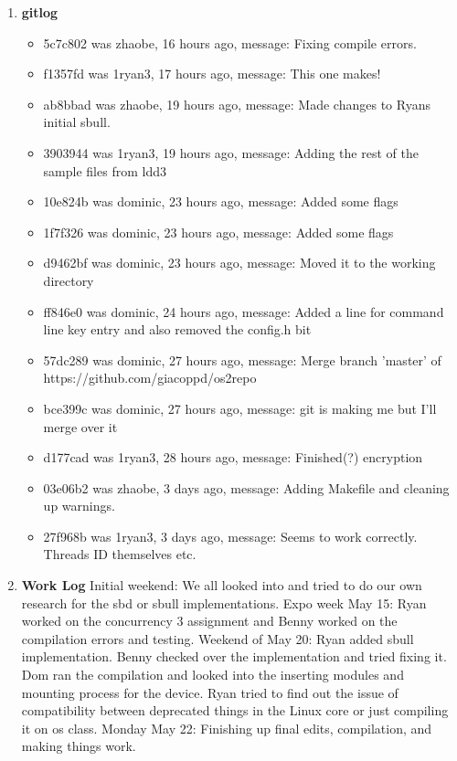 \documentclass[IEEEtran,letterpaper,10pt,notitlepage,draftclsnofoot,onecolumn]{article}
\begin{document}
\begin{enumerate}
\item
\textbf{gitlog}
\begin{itemize}
\item 5c7c802 was zhaobe, 16 hours ago, message: Fixing compile errors.
\item f1357fd was 1ryan3, 17 hours ago, message: This one makes!
\item ab8bbad was zhaobe, 19 hours ago, message: Made changes to Ryans initial sbull.
\item 3903944 was 1ryan3, 19 hours ago, message: Adding the rest of the sample files from ldd3
\item 10e824b was dominic, 23 hours ago, message: Added some flags
\item 1f7f326 was dominic, 23 hours ago, message: Added some flags
\item d9462bf was dominic, 23 hours ago, message: Moved it to the working directory
\item ff846e0 was dominic, 24 hours ago, message: Added a line for command line key entry and also removed the config.h bit
\item 57dc289 was dominic, 27 hours ago, message: Merge branch 'master' of https://github.com/giacoppd/os2repo
\item bce399c was dominic, 27 hours ago, message: git is making me but I'll merge over it
\item d177cad was 1ryan3, 28 hours ago, message: Finished(?) encryption
\item 03e06b2 was zhaobe, 3 days ago, message: Adding Makefile and cleaning up warnings.
\item 27f968b was 1ryan3, 3 days ago, message: Seems to work correctly. Threads ID themselves etc. 
\end{itemize}

\item
\textbf{Work Log}
Initial weekend: We all looked into and tried to do our own
research for the sbd or sbull implementations.
Expo week May 15: Ryan worked on the concurrency 3 assignment
and Benny worked on the compilation errors and testing.
Weekend of May 20: Ryan added sbull implementation. Benny checked
over the implementation and tried fixing it. Dom ran the compilation and
looked into the inserting modules and mounting process for the device.
Ryan tried to find out the issue of compatibility between deprecated things
in the Linux core or just compiling it on os class.
Monday May 22: Finishing up final edits, compilation, and making things work.

\end{enumerate}
\end{document}
